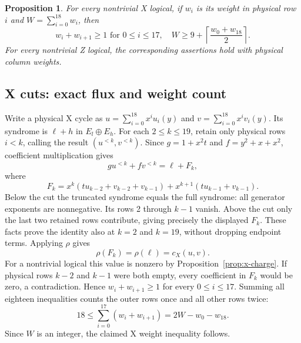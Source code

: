 \documentclass{article}
\newtheorem{proposition}{Proposition}
\begin{document}
\begin{proposition}\label{prop:transport}
  For every nontrivial X logical, if \(w_i\) is its weight in physical row
  \(i\) and \(W=\sum_{i=0}^{18}w_i\), then
  \begin{equation}
    w_i+w_{i+1}\ge 1 \text{ for } 0\le i\le 17,
    \quad W\ge 9+\left\lceil\frac{w_0+w_{18}}{2}\right\rceil.
  \end{equation}
  For every nontrivial Z logical, the corresponding assertions hold with
  physical column weights.
\end{proposition}

\subsection{X cuts: exact flux and weight count}\label{sec:x-cuts}

Write a physical X cycle as
\(u=\sum_{i=0}^{18}x^iu_i(y)\) and
\(v=\sum_{i=0}^{18}x^iv_i(y)\).
Its syndrome is \(\ell+h\) in \(E_l\oplus E_h\).
For each \(2\le k\le 19\), retain only physical rows \(i<k\), calling the
result \((u^{<k},v^{<k})\). Since \(g=1+x^2t\) and \(f=y^2+x+x^2\),
coefficient multiplication gives
\begin{equation}
  gu^{<k}+fv^{<k}=\ell+F_k,
\end{equation}
where
\begin{equation}
  F_k=x^k(tu_{k-2}+v_{k-2}+v_{k-1})
  +x^{k+1}(tu_{k-1}+v_{k-1}).
\end{equation}
Below the cut the truncated syndrome equals the full syndrome: all
generator exponents are nonnegative. Its rows 2 through \(k-1\) vanish.
Above the cut only the last two retained rows contribute, giving precisely
the displayed \(F_k\). These facts prove the identity also at \(k=2\) and
\(k=19\), without dropping endpoint terms.
Applying \(\rho\) gives
\begin{equation}
  \rho(F_k)=\rho(\ell)=c_X(u,v).
\end{equation}
For a nontrivial logical this value is nonzero by Proposition~\ref{prop:x-charge}.
If physical rows \(k-2\) and \(k-1\) were both empty, every coefficient in
\(F_k\) would be zero, a contradiction. Hence
\(w_i+w_{i+1}\ge 1\) for every \(0\le i\le 17\).
Summing all eighteen inequalities counts the outer rows once and all
other rows twice:
\begin{equation}
  18\le\sum_{i=0}^{17}(w_i+w_{i+1})=2W-w_0-w_{18}.
\end{equation}
Since \(W\) is an integer, the claimed X weight inequality follows.
\end{document}
